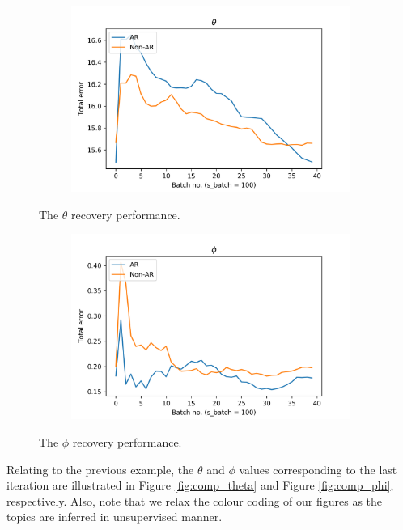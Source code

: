 \documentclass{mpaper}
\begin{document}
\begin{figure}[h]
  \centering
  \begin{subfigure}[b]{0.37\textwidth}
    \includegraphics[width=\linewidth]{performance-theta.png}
  \end{subfigure}%
  \caption{The $\theta$ recovery performance.}
  \label{fig:perf_theta}

  \begin{subfigure}[b]{0.37\textwidth}
    \includegraphics[width=\linewidth]{performance-phi.png}
  \end{subfigure}%
  \caption{The $\phi$ recovery performance.}
  \label{fig:perf_phi}
\end{figure}

\par Relating to the previous example, the $\theta$ and $\phi$ values corresponding to the last iteration are illustrated in Figure \ref{fig:comp_theta} and Figure \ref{fig:comp_phi}, respectively. Also, note that we relax the colour coding of our figures as the topics are inferred in unsupervised manner.
\end{document}
